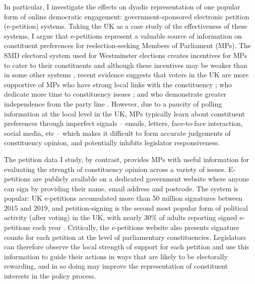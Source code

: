 \documentclass[12pt]{article}
\begin{document}
In particular, I investigate the effects on dyadic representation of one popular form of online democratic engagement: government-sponsored electronic petition (e-petition) systems. Taking the UK as a case study of the effectiveness of these systems, I argue that e-petitions represent a valuable source of information on constituent preferences for reelection-seeking Members of Parliament (MPs). The SMD electoral system used for Westminster elections creates incentives for MPs to cater to their constituents \citep{cain1984constituency} and although these incentives may be weaker than in some other systems \citep{carey1995incentives}, recent evidence suggests that voters in the UK are more supportive of MPs who have strong local links with the constituency \citep{campbell2019friends}; who dedicate more time to constituency issues \citep{vivyan2016house}; and who demonstrate greater independence from the party line \citep{vivyan2012voters, campbell2019legislator}. However, due to a paucity of polling information at the local level in the UK, MPs typically learn about constituent preferences through imperfect signals -- emails, letters, face-to-face interaction, social media, etc -- which makes it difficult to form accurate judgements of constituency opinion, and potentially inhibits legislator responsiveness. 

The petition data I study, by contrast, provides MPs with useful information for evaluating the strength of constituency opinion across a variety of issues. E-petitions are publicly available on a dedicated government website where anyone can sign by providing their name, email address and postcode. The system is popular: UK e-petitions accumulated more than 50 million signatures between 2015 and 2019, and petition-signing is the second most popular form of political activity (after voting) in the UK, with nearly 30\% of adults reporting signed e-petitions each year \citep{hansard2018audit}. Critically, the e-petitions website also presents signature counts for each petition at the level of parliamentary constituencies. Legislators can therefore observe the local strength of support for each petition and use this information to guide their actions in ways that are likely to be electorally rewarding, and in so doing may improve the representation of constituent interests in the policy process.
\end{document}
